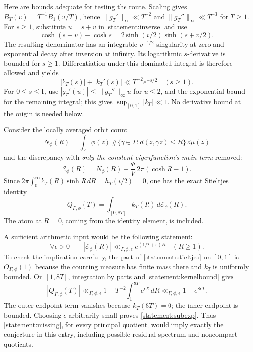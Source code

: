 \documentclass[11pt]{article}
\begin{document}
Here are bounds adequate for testing the route. Scaling gives
$B_T(u)=T^{-1}B_1(u/T)$, hence
$\|g_T'\|_\infty\ll T^{-2}$ and
$\|g_T''\|_\infty\ll T^{-3}$ for $T\ge1$.
For $s\ge1$, substitute $u=s+v$ in \eqref{statement:inverse} and use
\[
 \cosh(s+v)-\cosh s
   =2\sinh(v/2)\sinh(s+v/2).
\]
The resulting denominator has an integrable $v^{-1/2}$ singularity at zero
and exponential decay after inversion at infinity. Its logarithmic
$s$-derivative is bounded for $s\ge1$. Differentiation under this dominated
integral is therefore allowed and yields
\begin{equation}\label{statement:kernelbound}
 |k_T(s)|+|k_T'(s)|\ll T^{-2}e^{-s/2}\quad(s\ge1).
\end{equation}
For $0\le s\le1$, use
$|g_T'(u)|\le\|g_T''\|_\infty u$ for $u\le2$, and the exponential
bound for the remaining integral; this gives $\sup_{[0,1]}|k_T|\ll1$.
No derivative bound at the origin is needed below.

Consider the locally averaged orbit count
\[
 N_\phi(R)=\int_Y\phi(z)\,
          \#\{\gamma\in\Gamma:d(z,\gamma z)\le R\}\,d\mu(z)
\]
and the discrepancy with \emph{only the constant eigenfunction's main term}
removed:
\begin{equation}\label{statement:error}
 \mathcal E_\phi(R)=N_\phi(R)
       -\frac{\Phi}{V}\,2\pi(\cosh R-1).
\end{equation}
Since
$2\pi\int_0^\infty k_T(R)\sinh R\,dR=h_T(i/2)=0$, one has the exact
Stieltjes identity
\begin{equation}\label{statement:stieltjes}
 Q_{\Gamma,\phi}(T)=\int_{[0,8T]}k_T(R)\,d\mathcal E_\phi(R).
\end{equation}
The atom at $R=0$, coming from the identity element, is included.

A sufficient arithmetic input would be the following statement:
\begin{equation}\label{statement:missing}
 \boxed{\quad
 \forall\epsilon>0\qquad
 |\mathcal E_\phi(R)|\ll_{\Gamma,\phi,\epsilon}
           e^{(1/2+\epsilon)R}\quad(R\ge1).
 \quad}
\end{equation}
To check the implication carefully, the part of
\eqref{statement:stieltjes} on $[0,1]$ is $O_{\Gamma,\phi}(1)$ because the
counting measure has finite mass there and $k_T$ is uniformly bounded.
On $[1,8T]$, integration by parts and \eqref{statement:kernelbound} give
\[
 |Q_{\Gamma,\phi}(T)|
 \ll_{\Gamma,\phi,\epsilon}
 1+T^{-2}\int_1^{8T}e^{\epsilon R}\,dR
 \ll_{\Gamma,\phi,\epsilon}1+e^{8\epsilon T}.
\]
The outer endpoint term vanishes because $k_T(8T)=0$; the inner endpoint is
bounded. Choosing $\epsilon$ arbitrarily small proves
\eqref{statement:subexp}. Thus \eqref{statement:missing}, for every principal quotient,
would imply exactly the conjecture in this entry, including possible residual
spectrum and noncompact quotients.
\end{document}
